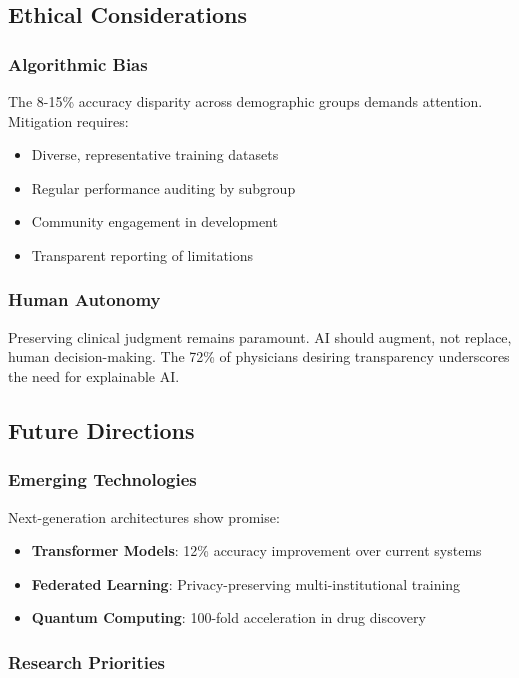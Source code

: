 \documentclass[12pt,letterpaper]{article}
\begin{document}
\subsection{Ethical Considerations}

\subsubsection{Algorithmic Bias}

The 8-15\% accuracy disparity across demographic groups demands attention. Mitigation requires:
\begin{itemize}
\item Diverse, representative training datasets
\item Regular performance auditing by subgroup
\item Community engagement in development
\item Transparent reporting of limitations
\end{itemize}

\subsubsection{Human Autonomy}

Preserving clinical judgment remains paramount. AI should augment, not replace, human decision-making. The 72\% of physicians desiring transparency underscores the need for explainable AI.

\subsection{Future Directions}

\subsubsection{Emerging Technologies}

Next-generation architectures show promise:
\begin{itemize}
\item \textbf{Transformer Models}: 12\% accuracy improvement over current systems
\item \textbf{Federated Learning}: Privacy-preserving multi-institutional training
\item \textbf{Quantum Computing}: 100-fold acceleration in drug discovery
\end{itemize}

\subsubsection{Research Priorities}
\end{document}
